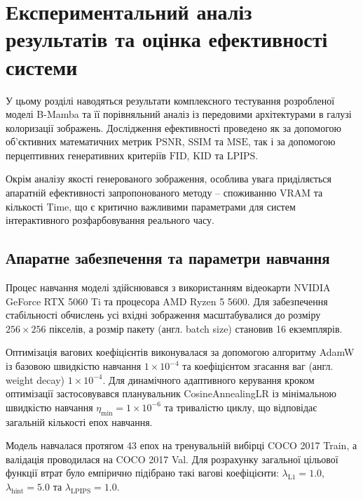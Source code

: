 
\chapter{Експериментальний аналіз результатів та оцінка ефективності системи}
    \label{chap:results}

    У цьому розділі наводяться результати комплексного тестування розробленої моделі B-Mamba та її порівняльний аналіз із передовими архітектурами в галузі колоризації зображень.
    Дослідження ефективності проведено як за допомогою об'єктивних математичних метрик $\mathrm{PSNR}$, $\mathrm{SSIM}$ та $\mathrm{MSE}$,
    так і за допомогою перцептивних генеративних критеріїв $\mathrm{FID}$, $\mathrm{KID}$ та $\mathrm{LPIPS}$. 

    Окрім аналізу якості генерованого зображення, особлива увага приділяється апаратній ефективності запропонованого методу -- споживанню $\mathrm{VRAM}$ та кількості $\mathrm{Time}$,
    що є критично важливими параметрами для систем інтерактивного розфарбовування реального часу.

    \section{Апаратне забезпечення та параметри навчання}
        Процес навчання моделі здійснювався з використанням відеокарти NVIDIA GeForce RTX 5060 Ti та процесора AMD Ryzen 5 5600.
        Для забезпечення стабільності обчислень усі вхідні зображення масштабувалися до розміру $256 \times 256$ пікселів, а розмір пакету (англ. batch size) становив 16 екземплярів.
        
        Оптимізація вагових коефіцієнтів виконувалася за допомогою алгоритму AdamW із базовою швидкістю навчання $1 \times 10^{-4}$ та коефіцієнтом згасання ваг (англ. weight decay) $1 \times 10^{-4}$.
        Для динамічного адаптивного керування кроком оптимізації застосовувався планувальник CosineAnnealingLR із мінімальною швидкістю навчання $\eta_{\min} = 1 \times 10^{-6}$
        та тривалістю циклу, що відповідає загальній кількості епох навчання.
        
        Модель навчалася протягом 43 епох на тренувальній вибірці COCO 2017 Train, а валідація проводилася на COCO 2017 Val.
        Для розрахунку загальної цільової функції втрат було емпірично підібрано такі вагові коефіцієнти: $\lambda_{\mathrm{L1}} = 1.0$, $\lambda_{\mathrm{hint}} = 5.0$ та $\lambda_{\mathrm{LPIPS}} = 1.0$. 
        
